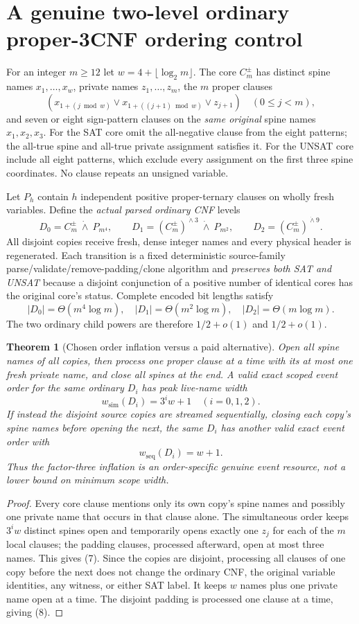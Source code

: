 \documentclass[11pt]{article}
\newtheorem{theorem}{Theorem}
\begin{document}
\section{A genuine two-level ordinary proper-3CNF ordering control}
For an integer $m\ge12$ let $w=4+\lfloor\log_2m\rfloor$.
The core $C_m^\pm$ has distinct spine names
$x_1,\dots,x_w$, private names $z_1,\dots,z_m$,
the $m$ proper clauses
\[
 (x_{1+(j\bmod w)}\lor
  x_{1+((j+1)\bmod w)}\lor z_{j+1})
 \quad (0\le j<m),
\]
and seven or eight sign-pattern clauses
on the \emph{same original} spine names $x_1,x_2,x_3$.
For the SAT core omit the all-negative clause from the
eight patterns; the all-true spine and all-true
private assignment satisfies it.  For the UNSAT core
include all eight patterns, which exclude every
assignment on the first three spine coordinates.
No clause repeats an unsigned variable.

Let $P_h$ contain $h$ independent positive
proper-ternary clauses on wholly fresh variables.
Define the \emph{actual parsed ordinary CNF} levels
\[
 D_0=C_m^\pm\ \dot\wedge\ P_{m^4},\qquad
 D_1=(C_m^\pm)^{\dot\wedge3}\ \dot\wedge\ P_{m^2},\qquad
 D_2=(C_m^\pm)^{\dot\wedge9}.
 \tag{6}
\]
All disjoint copies receive fresh, dense integer
names and every physical header is regenerated.
Each transition is a fixed deterministic source-family
parse/validate/remove-padding/clone algorithm
and \emph{preserves both SAT and UNSAT} because a
disjoint conjunction of a positive number of identical
cores has the original core's status.
Complete encoded bit lengths satisfy
\[
 |D_0|=\Theta(m^4\log m),\quad
 |D_1|=\Theta(m^2\log m),\quad
 |D_2|=\Theta(m\log m).
\]
The two ordinary child powers are therefore
$1/2+o(1)$ and $1/2+o(1)$.

\begin{theorem}[Chosen order inflation versus a paid alternative]
Open all spine names of all copies, then process one
proper clause at a time with its at most one fresh
private name, and close all spines at the end.
A valid exact scoped event order for the same
ordinary $D_i$ has peak live-name width
\[
 w_{\mathrm{sim}}(D_i)=3^iw+1\quad(i=0,1,2).
 \tag{7}
\]
If instead the disjoint source copies are streamed
\emph{sequentially}, closing each copy's spine names
before opening the next, the same $D_i$
has another valid exact event order with
\[
 w_{\mathrm{seq}}(D_i)=w+1 .
 \tag{8}
\]
Thus the factor-three inflation is an
\emph{order-specific genuine event resource},
not a lower bound on minimum scope width.
\end{theorem}
\begin{proof}
Every core clause mentions only its own copy's
spine names and possibly one private name that
occurs in that clause alone.  The simultaneous
order keeps $3^iw$ distinct spines open and
temporarily opens exactly one $z_j$ for each
of the $m$ local clauses; the padding clauses,
processed afterward, open at most three names.
This gives (7).  Since the copies are disjoint,
processing all clauses of one copy before the next
does not change the ordinary CNF, the original
variable identities, any witness, or either SAT
label.  It keeps $w$ names plus one private name
open at a time.  The disjoint padding is processed
one clause at a time, giving (8).
\end{proof}
\end{document}
